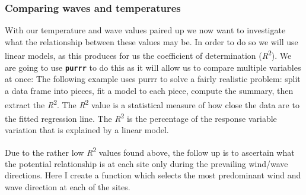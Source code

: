 \documentclass[10pt,a4,]{article}
\begin{document}
\hypertarget{comparing-waves-and-temperatures}{%
\subsubsection{Comparing waves and
temperatures}\label{comparing-waves-and-temperatures}}

With our temperature and wave values paired up we now want to
investigate what the relationship between these values may be. In order
to do so we will use linear models, as this produces for us the
coefficient of determination (\emph{R}\textsuperscript{2}). We are going
to use \textbf{\texttt{purrr}} to do this as it will allow us to compare
multiple variables at once: The following example uses purrr to solve a
fairly realistic problem: split a data frame into pieces, fit a model to
each piece, compute the summary, then extract the
\emph{R}\textsuperscript{2}. The \emph{R}\textsuperscript{2} value is a
statistical measure of how close the data are to the fitted regression
line. The \emph{R}\textsuperscript{2} is the percentage of the response
variable variation that is explained by a linear model.

Due to the rather low \emph{R}\textsuperscript{2} values found above,
the follow up is to ascertain what the potential relationship is at each
site only during the prevailing wind/wave directions. Here I create a
function which selects the most predominant wind and wave direction at
each of the sites.
\end{document}

